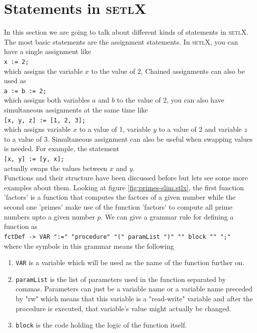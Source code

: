 \documentclass[11pt]{report}
\begin{document}
\section{Statements in \textsc{setlX}}
In this section we are going to talk about different kinds of statements in \textsc{setlX}. The most basic statements are the assignment statements. In \textsc{setlX}, you can have a single assignment like
\\[0.2cm]
\hspace*{1.3cm}
\texttt{x := 2;}
\\[0.2cm]
which assigns the variable $x$ to the value of $2$, Chained assignments can also be used as
\\[0.2cm]
\hspace*{1.3cm}
\texttt{a := b := 2;}
\\[0.2cm]
which assigns both variables $a$ and $b$ to the value of 2, you can also have simultaneous assignments at the same time like
\\[0.2cm]
\hspace*{1.3cm}
\texttt{[x, y, z] := [1, 2, 3];}
\\[0.2cm]
which assigns variable $x$ to a value of 1, variable $y$ to a value of 2 and variable $z$ to a value of 3. Simultaneous assignment can also be useful when swapping values is needed. For example, the statement
\\[0.2cm]
\hspace*{1.3cm}
\texttt{[x, y] := [y, x];}
\\[0.2cm]
actually swaps the values between $x$ and $y$.
\\

Functions and their structure have been discussed before but lets see some more examples about them. Looking at figure \ref{fig:primes-slim.stlx}, the first function 'factors' is a function that computes the factors of a given number while the second one 'primes' make use of the function 'factors' to compute all prime numbers upto a given number $p$. We can give a grammar rule for defining a function as
\\[0.2cm]
\hspace*{1.3cm}
\texttt{fctDef -> VAR ":=" "procedure" "(" paramList ")" "{" block "}" ";"}
\\[0.2cm]
where the symbols in this grammar means the following
\begin{enumerate}
\item \texttt{VAR} is a variable which will be used as the name of the function further on.
\item \texttt{paramList} is the list of parameters used in the function separated by commas. Parameters can just be a variable name or a variable name preceded by "rw" which means that this variable is a "read-write" variable and after the procedure is executed, that variable's value might actually be changed.
\item \texttt{block} is the code holding the logic of the function itself.
\end{enumerate}
\end{document}
